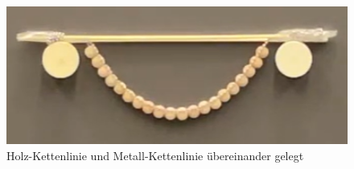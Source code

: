 \begin{figure}
	\centering
	\includegraphics[width=1\textwidth]{papers/kettenlinie/images/kettenlinie_holz_metall.png}
	\caption{Holz-Kettenlinie und Metall-Kettenlinie übereinander gelegt}
	\label{fig:Kettenlinie-Holz-Metall}
\end{figure}
